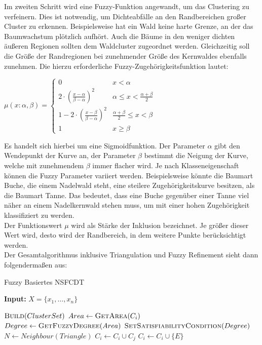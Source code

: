 \documentclass[11pt,ceqn]{book}
\begin{document}
Im zweiten Schritt wird eine Fuzzy-Funktion angewandt, um das Clustering zu verfeinern. Dies ist notwendig, um Dichteabfälle an den Randbereichen großer Cluster zu erkennen. Beispielsweise hat ein Wald keine harte Grenze, an der das Baumwachstum plötzlich aufhört. Auch die Bäume in den weniger dichten äußeren Regionen sollten dem Waldcluster zugeordnet werden. Gleichzeitig soll die Größe der Randregionen bei zunehmender Größe des Kernwaldes ebenfalls zunehmen. Die hierzu erforderliche Fuzzy-Zugehörigkeitsfunktion lautet:

$\mu(x:\alpha,\beta) = \left\{
\begin{array}{ll}
0 & x < \alpha \\
2\cdot\left(\frac{x-\alpha}{\beta-\alpha}\right)^2 & \alpha \leqslant x < \frac{\alpha + \beta}{2} \\
1-2\cdot\left(\frac{x-\beta}{\beta-\alpha}\right)^2 & \frac{\alpha + \beta}{2} \leqslant x < \beta \\
1 & x \geqslant \beta
\end{array}
\right. $

Es handelt sich hierbei um eine Sigmoidfunktion. Der Parameter $\alpha$ gibt den Wendepunkt der Kurve an, der Parameter $\beta$ bestimmt die Neigung der Kurve, welche mit zunehmendem $\beta$ immer flacher wird. Je nach Klasseneigenschaft können die Fuzzy Parameter variiert werden. Beispielsweise könnte die Baumart Buche, die einem Nadelwald steht, eine steilere Zugehörigkeitskurve besitzen, als die Baumart Tanne. Das bedeutet, dass eine Buche gegenüber einer Tanne viel näher an einem Nadelkernwald stehen muss, um mit einer hohen Zugehörigkeit klassifiziert zu werden. 
\\
Der Funktionswert $\mu$ wird als Stärke der Inklusion bezeichnet. Je größer dieser Wert wird, desto wird der Randbereich, in dem weitere Punkte berücksichtigt werden.\\
Der Gesamtalgorithmus inklusive Triangulation und Fuzzy Refinement sieht dann folgendermaßen aus:

\begin{algorithm}[H]
\caption{Fuzzy Basiertes NSFCDT}\label{nsfcdt}
\hspace*{\algorithmicindent} \textbf{Input:} $X=\{x_1,\dots,x_n\}$ 
\begin{algorithmic}[1]
\State $\textsc{Build} (ClusterSet)$
\State $Area \gets \textsc{Get}\textsc{Area}(C_i)$
\State $Degree \gets \textsc{Get}\textsc{Fuzzy}\textsc{Degree}(Area)$
\State $\textsc{Set}\textsc{Satisfiability}\textsc{Condition}(Degree)$
\State $N \gets Neighbour(Triangle)$
\State $C_i \gets C_i \cup C_j$
\Else 
\State $C_i \gets C_i \cup \{E\}$
\EndIf
\EndIf
\EndFor
\EndFor
\EndFor
\end{algorithmic}
\end{algorithm} 
\end{document}
